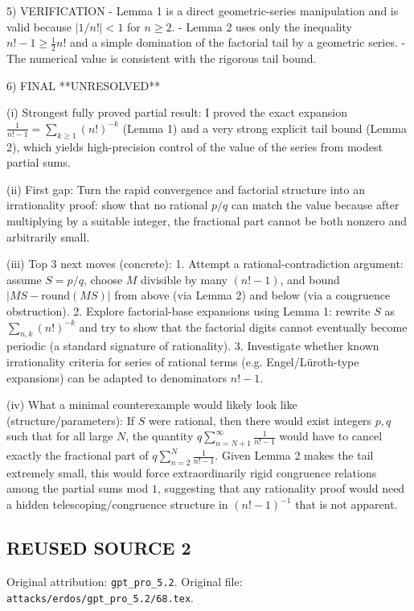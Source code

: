 5) VERIFICATION
- Lemma 1 is a direct geometric-series manipulation and is valid because $|1/n!|<1$ for $n\ge 2$.
- Lemma 2 uses only the inequality $n!-1\ge \tfrac12 n!$ and a simple domination of the factorial tail by a geometric series.
- The numerical value is consistent with the rigorous tail bound.

6) FINAL
**UNRESOLVED**

(i) Strongest fully proved partial result:
I proved the exact expansion $\frac{1}{n!-1}=\sum_{k\ge 1}(n!)^{-k}$ (Lemma 1) and a very strong explicit tail bound (Lemma 2),
which yields high-precision control of the value of the series from modest partial sums.

(ii) First gap:
Turn the rapid convergence and factorial structure into an irrationality proof: show that no rational $p/q$ can match the value because
after multiplying by a suitable integer, the fractional part cannot be both nonzero and arbitrarily small.

(iii) Top 3 next moves (concrete):
1. Attempt a rational-contradiction argument: assume $S=p/q$, choose $M$ divisible by many $(n!-1)$, and bound $|MS-\mathrm{round}(MS)|$ from above (via Lemma 2) and below (via a congruence obstruction).
2. Explore factorial-base expansions using Lemma 1: rewrite $S$ as $\sum_{n,k}(n!)^{-k}$ and try to show that the factorial digits cannot eventually become periodic (a standard signature of rationality).
3. Investigate whether known irrationality criteria for series of rational terms (e.g. Engel/L\"uroth-type expansions) can be adapted to denominators $n!-1$.

(iv) What a minimal counterexample would likely look like (structure/parameters):
If $S$ were rational, then there would exist integers $p,q$ such that for all large $N$,
the quantity $q\sum_{n=N+1}^{\infty}\frac{1}{n!-1}$ would have to cancel exactly the fractional part of $q\sum_{n=2}^{N}\frac{1}{n!-1}$.
Given Lemma 2 makes the tail extremely small, this would force extraordinarily rigid congruence relations among the partial sums mod $1$,
suggesting that any rationality proof would need a hidden telescoping/congruence structure in $(n!-1)^{-1}$ that is not apparent.



\subsection*{REUSED SOURCE 2}
Original attribution: \texttt{gpt\_pro\_5.2}.
Original file: \texttt{attacks/erdos/gpt\_pro\_5.2/68.tex}.

